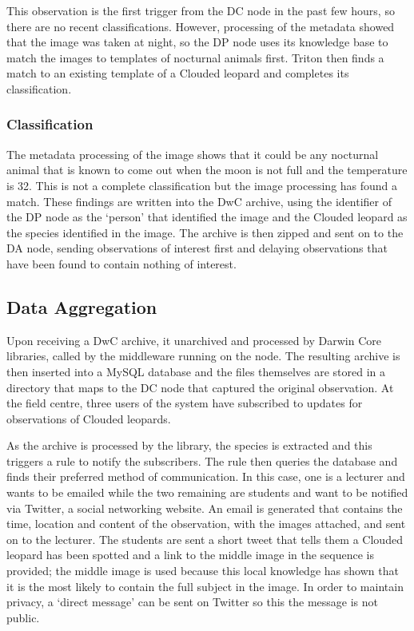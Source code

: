 			This observation is the first trigger from the DC node in the past few hours, so there are no recent classifications. However, processing of the metadata showed that the image was taken at night, so the DP node uses its knowledge base to match the images to templates of nocturnal animals first. Triton then finds a match to an existing template of a Clouded leopard and completes its classification.
	
		\subsubsection{Classification}
		The metadata processing of the image shows that it could be any nocturnal animal that is known to come out when the moon is not full and the temperature is 32\celsius. This is not a complete classification but the image processing has found a match. These findings are written into the DwC archive, using the identifier of the DP node as the `person' that identified the image and the Clouded leopard as the species identified in the image. The archive is then zipped and sent on to the DA node, sending observations of interest first and delaying observations that have been found to contain nothing of interest.
			
	\subsection{Data Aggregation}		
			Upon receiving a DwC archive, it unarchived and processed by Darwin Core libraries, called by the middleware running on the node. The resulting archive is then inserted into a MySQL database and the files themselves are stored in a directory that maps to the DC node that captured the original observation. At the field centre, three users of the system have subscribed to updates for observations of Clouded leopards.
			
			As the archive is processed by the library, the species is extracted and this triggers a rule to notify the subscribers. The rule then queries the database and finds their preferred method of communication. In this case, one is a lecturer and wants to be emailed while the two remaining are students and want to be notified via Twitter, a social networking website. An email is generated that contains the time, location and content of the observation, with the images attached, and sent on to the lecturer. The students are sent a short tweet that tells them a Clouded leopard has been spotted and a link to the middle image in the sequence is provided; the middle image is used because this local knowledge has shown that it is the most likely to contain the full subject in the image. In order to maintain privacy, a `direct message' can be sent on Twitter so this the message is not public.
			
